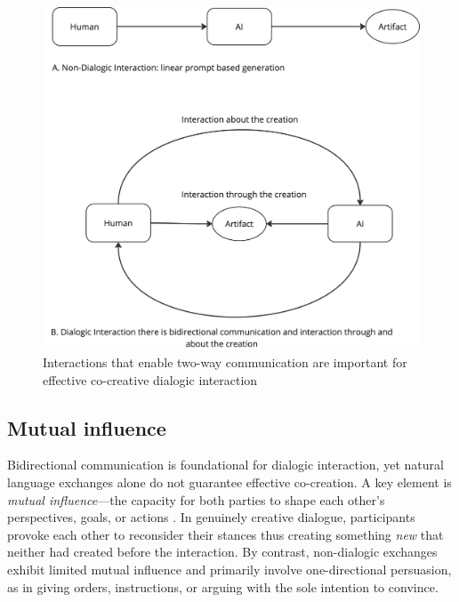 \begin{figure}
    \centering
    \includegraphics[width=0.75\linewidth]{Bidirectional.png}
    \caption{Interactions that enable two-way communication are important for effective co-creative dialogic interaction}
    \label{fig:enter-label}
\end{figure}

\subsection{Mutual influence}

Bidirectional communication is foundational for dialogic interaction, yet natural language exchanges alone do not guarantee effective co-creation. A key element is \textit{mutual influence}—the capacity for both parties to shape each other's perspectives, goals, or actions \cite{Bown2020-zn}. In genuinely creative dialogue, participants provoke each other to reconsider their stances thus creating something \textit{new} that neither had created before the interaction. By contrast, non-dialogic exchanges exhibit limited mutual influence and primarily involve one-directional persuasion, as in giving orders, instructions, or arguing with the sole intention to convince.

